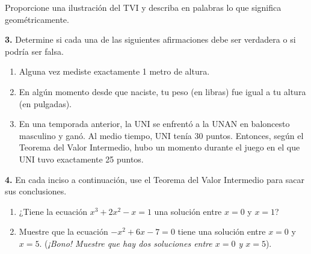 \documentclass{article}
\begin{document}
\noindent {}

\vspace{0.4cm}
\noindent Proporcione una ilustración del TVI y describa en palabras lo que significa geométricamente.

\vspace{0.5cm}

\noindent \textbf{3.} Determine si cada una de las siguientes afirmaciones debe ser verdadera o si podría ser falsa.
\begin{enumerate}[label=(\alph*)]
    \item Alguna vez mediste exactamente 1 metro de altura.
    \item En algún momento desde que naciste, tu peso (en libras) fue igual a tu altura (en pulgadas).
    \item En una temporada anterior, la UNI se enfrentó a la UNAN en baloncesto masculino y ganó. Al medio tiempo, UNI tenía 30 puntos. Entonces, según el Teorema del Valor Intermedio, hubo un momento durante el juego en el que UNI tuvo exactamente 25 puntos.
\end{enumerate}

\vspace{0.5cm}

\noindent \textbf{4.} En cada inciso a continuación, use el Teorema del Valor Intermedio para sacar sus conclusiones.
\begin{enumerate}[label=(\alph*)]
    \item ¿Tiene la ecuación $x^3+2x^2-x=1$ una solución entre $x=0$ y $x=1$?
    \item Muestre que la ecuación $-x^2+6x-7=0$ tiene una solución entre $x=0$ y $x=5$. (\textit{¡Bono! Muestre que hay dos soluciones entre $x=0$ y $x=5$}).
\end{enumerate}
\end{document}
